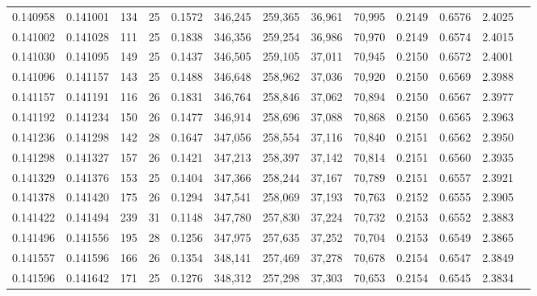 \begin{tabular}{rrrrrrrrrrrrr}
0.140958 & 0.141001 & 134 &  25 &                                     0.1572 & 346,245 & 259,365 &  36,961 &  70,995 & 0.2149 & 0.6576 & 2.4025 \\
0.141002 & 0.141028 & 111 &  25 &                                     0.1838 & 346,356 & 259,254 &  36,986 &  70,970 & 0.2149 & 0.6574 & 2.4015 \\
0.141030 & 0.141095 & 149 &  25 &                                     0.1437 & 346,505 & 259,105 &  37,011 &  70,945 & 0.2150 & 0.6572 & 2.4001 \\
0.141096 & 0.141157 & 143 &  25 &                                     0.1488 & 346,648 & 258,962 &  37,036 &  70,920 & 0.2150 & 0.6569 & 2.3988 \\
0.141157 & 0.141191 & 116 &  26 &                                     0.1831 & 346,764 & 258,846 &  37,062 &  70,894 & 0.2150 & 0.6567 & 2.3977 \\
0.141192 & 0.141234 & 150 &  26 &                                     0.1477 & 346,914 & 258,696 &  37,088 &  70,868 & 0.2150 & 0.6565 & 2.3963 \\
0.141236 & 0.141298 & 142 &  28 &                                     0.1647 & 347,056 & 258,554 &  37,116 &  70,840 & 0.2151 & 0.6562 & 2.3950 \\
0.141298 & 0.141327 & 157 &  26 &                                     0.1421 & 347,213 & 258,397 &  37,142 &  70,814 & 0.2151 & 0.6560 & 2.3935 \\
0.141329 & 0.141376 & 153 &  25 &                                     0.1404 & 347,366 & 258,244 &  37,167 &  70,789 & 0.2151 & 0.6557 & 2.3921 \\
0.141378 & 0.141420 & 175 &  26 &                                     0.1294 & 347,541 & 258,069 &  37,193 &  70,763 & 0.2152 & 0.6555 & 2.3905 \\
0.141422 & 0.141494 & 239 &  31 &                                     0.1148 & 347,780 & 257,830 &  37,224 &  70,732 & 0.2153 & 0.6552 & 2.3883 \\
0.141496 & 0.141556 & 195 &  28 &                                     0.1256 & 347,975 & 257,635 &  37,252 &  70,704 & 0.2153 & 0.6549 & 2.3865 \\
0.141557 & 0.141596 & 166 &  26 &                                     0.1354 & 348,141 & 257,469 &  37,278 &  70,678 & 0.2154 & 0.6547 & 2.3849 \\
0.141596 & 0.141642 & 171 &  25 &                                     0.1276 & 348,312 & 257,298 &  37,303 &  70,653 & 0.2154 & 0.6545 & 2.3834 \\

\end{tabular}
